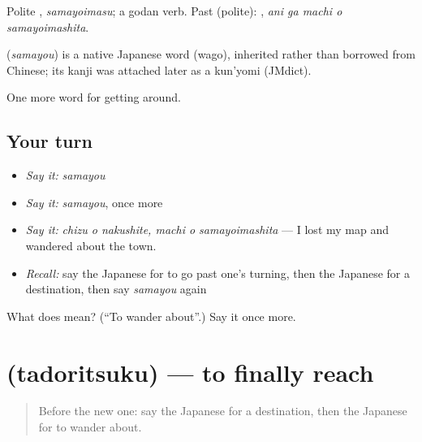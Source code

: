 Polite \textbf{}, \emph{samayoimasu}; a godan verb. Past (polite): \textbf{  }, \emph{ani ga machi o samayoimashita}.

\begin{cousinweb}
\textbf{} (\emph{samayou}) is a native Japanese word (wago), inherited rather than borrowed from Chinese; its kanji was attached later as a kun'yomi (JMdict).
\end{cousinweb}

\begin{grammarlens}[title={What you've built}]
One more word for getting around.
\end{grammarlens}

\subsection*{Your turn}
\begin{itemize}
\raggedright
  \item \emph{Say it:} \emph{samayou}
  \item \emph{Say it:} \emph{samayou}, once more
  \item \emph{Say it:} \emph{chizu o nakushite, machi o samayoimashita} — I lost my map and wandered about the town.
  \item \emph{Recall:} say the Japanese for to go past one's turning, then the Japanese for a destination, then say \emph{samayou} again
\end{itemize}

\begin{tcolorbox}[breakable,colback=teal!4,colframe=teal!35!black,title={Before you move on}]
What does  mean? (\textquotedblleft{}To wander about\textquotedblright{}.) Say it once more.
\end{tcolorbox}
\section[\texorpdfstring{\ja{たどりつく} (tadoritsuku)}{たどりつく (tadoritsuku)}]{ (tadoritsuku) — to finally reach}

\label{lesson:JA-C396-tadoritsuku}



\begin{quote}
Before the new one: say the Japanese for a destination, then the Japanese for to wander about.
\end{quote}

